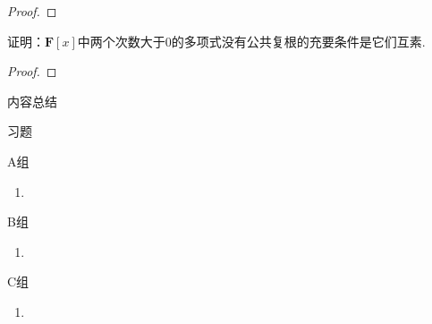 \begin{proof}

\end{proof}

\begin{example}
    证明：$\mathbf{F}[x]$中两个次数大于0的多项式没有公共复根的充要条件是它们互素.
\end{example}

\begin{proof}

\end{proof}

\vspace{2ex}
\centerline{\heiti \Large 内容总结}

\vspace{2ex}
\centerline{\heiti \Large 习题}

\vspace{2ex}
{\kaishu }
\begin{flushright}
    \kaishu

\end{flushright}

\centerline{\heiti A组}
\begin{enumerate}
    \item
\end{enumerate}

\centerline{\heiti B组}
\begin{enumerate}
    \item
\end{enumerate}

\centerline{\heiti C组}
\begin{enumerate}
    \item
\end{enumerate}

